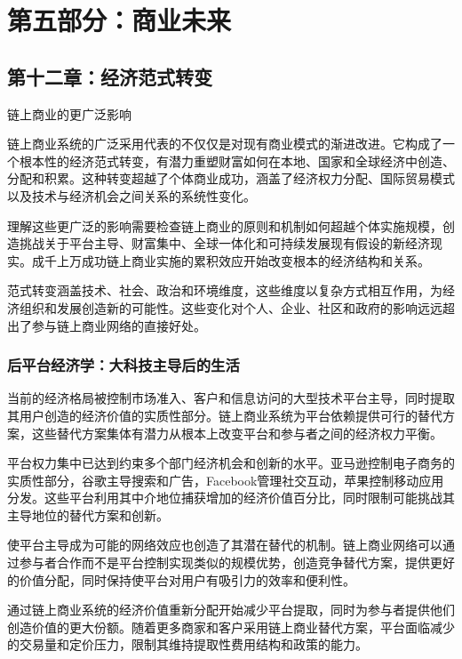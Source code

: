 \documentclass[
  Letterpaper,
]{scrbook}
\begin{document}
\part{第五部分：商业未来}

\chapter{第十二章：经济范式转变}\label{sec-paradigm-shift}

链上商业的更广泛影响

链上商业系统的广泛采用代表的不仅仅是对现有商业模式的渐进改进。它构成了一个根本性的经济范式转变，有潜力重塑财富如何在本地、国家和全球经济中创造、分配和积累。这种转变超越了个体商业成功，涵盖了经济权力分配、国际贸易模式以及技术与经济机会之间关系的系统性变化。

理解这些更广泛的影响需要检查链上商业的原则和机制如何超越个体实施规模，创造挑战关于平台主导、财富集中、全球一体化和可持续发展现有假设的新经济现实。成千上万成功链上商业实施的累积效应开始改变根本的经济结构和关系。

范式转变涵盖技术、社会、政治和环境维度，这些维度以复杂方式相互作用，为经济组织和发展创造新的可能性。这些变化对个人、企业、社区和政府的影响远远超出了参与链上商业网络的直接好处。

\section{后平台经济学：大科技主导后的生活}\label{ux540eux5e73ux53f0ux7ecfux6d4eux5b66ux5927ux79d1ux6280ux4e3bux5bfcux540eux7684ux751fux6d3b}

当前的经济格局被控制市场准入、客户和信息访问的大型技术平台主导，同时提取其用户创造的经济价值的实质性部分。链上商业系统为平台依赖提供可行的替代方案，这些替代方案集体有潜力从根本上改变平台和参与者之间的经济权力平衡。

平台权力集中已达到约束多个部门经济机会和创新的水平。亚马逊控制电子商务的实质性部分，谷歌主导搜索和广告，Facebook管理社交互动，苹果控制移动应用分发。这些平台利用其中介地位捕获增加的经济价值百分比，同时限制可能挑战其主导地位的替代方案和创新。

使平台主导成为可能的网络效应也创造了其潜在替代的机制。链上商业网络可以通过参与者合作而不是平台控制实现类似的规模优势，创造竞争替代方案，提供更好的价值分配，同时保持使平台对用户有吸引力的效率和便利性。

通过链上商业系统的经济价值重新分配开始减少平台提取，同时为参与者提供他们创造价值的更大份额。随着更多商家和客户采用链上商业替代方案，平台面临减少的交易量和定价压力，限制其维持提取性费用结构和政策的能力。
\end{document}
